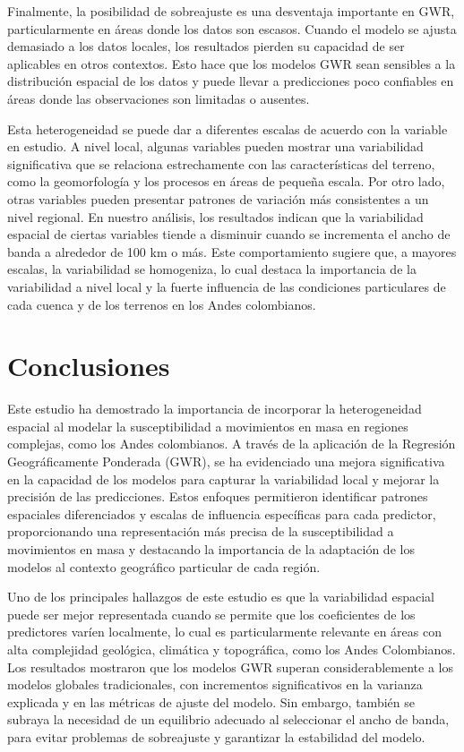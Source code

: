 \documentclass[
  manuscript=article,  
  layout=preprint,  
]{format}
\begin{document}
Finalmente, la posibilidad de sobreajuste es una desventaja importante en GWR, particularmente en áreas donde los datos son escasos. Cuando el modelo se ajusta demasiado a los datos locales, los resultados pierden su capacidad de ser aplicables en otros contextos. Esto hace que los modelos GWR sean sensibles a la distribución espacial de los datos y puede llevar a predicciones poco confiables en áreas donde las observaciones son limitadas o ausentes.

Esta heterogeneidad se puede dar a diferentes escalas de acuerdo con la variable en estudio. A nivel local, algunas variables pueden mostrar una variabilidad significativa que se relaciona estrechamente con las características del terreno, como la geomorfología y los procesos en áreas de pequeña escala. Por otro lado, otras variables pueden presentar patrones de variación más consistentes a un nivel regional. En nuestro análisis, los resultados indican que la variabilidad espacial de ciertas variables tiende a disminuir cuando se incrementa el ancho de banda a alrededor de 100 km o más. Este comportamiento sugiere que, a mayores escalas, la variabilidad se homogeniza, lo cual destaca la importancia de la variabilidad a nivel local y la fuerte influencia de las condiciones particulares de cada cuenca y de los terrenos en los Andes colombianos.

\section{Conclusiones}
Este estudio ha demostrado la importancia de incorporar la heterogeneidad espacial al modelar la susceptibilidad a movimientos en masa en regiones complejas, como los Andes colombianos. A través de la aplicación de la Regresión Geográficamente Ponderada (GWR), se ha evidenciado una mejora significativa en la capacidad de los modelos para capturar la variabilidad local y mejorar la precisión de las predicciones. Estos enfoques permitieron identificar patrones espaciales diferenciados y escalas de influencia específicas para cada predictor, proporcionando una representación más precisa de la susceptibilidad a movimientos en masa y destacando la importancia de la adaptación de los modelos al contexto geográfico particular de cada región.

Uno de los principales hallazgos de este estudio es que la variabilidad espacial puede ser mejor representada cuando se permite que los coeficientes de los predictores varíen localmente, lo cual es particularmente relevante en áreas con alta complejidad geológica, climática y topográfica, como los Andes Colombianos. Los resultados mostraron que los modelos GWR superan considerablemente a los modelos globales tradicionales, con incrementos significativos en la varianza explicada y en las métricas de ajuste del modelo. Sin embargo, también se subraya la necesidad de un equilibrio adecuado al seleccionar el ancho de banda, para evitar problemas de sobreajuste y garantizar la estabilidad del modelo.
\end{document}
